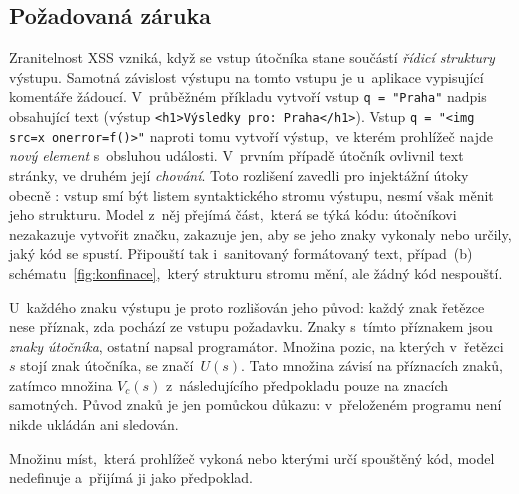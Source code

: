 \subsection{Požadovaná záruka}
\label{sec:model-cil}

Zranitelnost XSS vzniká, když se vstup útočníka stane součástí \emph{řídicí struktury} výstupu. Samotná závislost výstupu na tomto vstupu je u~aplikace vypisující komentáře žádoucí. V~průběžném příkladu vytvoří vstup \texttt{q = "Praha"} nadpis obsahující text (výstup \verb|<h1>Výsledky pro: Praha</h1>|). Vstup \texttt{q = "<img src=x onerror=f()>"} naproti tomu vytvoří výstup,~ve kterém prohlížeč najde \emph{nový element} s~obsluhou události. V~prvním případě útočník ovlivnil text stránky, ve druhém její \emph{chování}. Toto rozlišení zavedli pro injektážní útoky obecně \textcite{su2006essence}: vstup smí být listem syntaktického stromu výstupu, nesmí však měnit jeho strukturu. Model z~něj přejímá část,~která se týká kódu: útočníkovi nezakazuje vytvořit značku, zakazuje jen, aby se jeho znaky vykonaly nebo určily, jaký kód se spustí. Připouští tak i~sanitovaný formátovaný text, případ~(b) schématu~\ref{fig:konfinace},~který strukturu stromu mění, ale žádný kód nespouští.

U~každého znaku výstupu je proto rozlišován jeho původ: každý znak řetězce nese příznak, zda pochází ze vstupu požadavku. Znaky s~tímto příznakem jsou \emph{znaky útočníka}, ostatní napsal programátor. Množina pozic, na kterých v~řetězci~$s$ stojí znak útočníka, se značí~$U(s)$. Tato množina závisí na příznacích znaků, zatímco množina $V_c(s)$ z~následujícího předpokladu pouze na znacích samotných. Původ znaků je jen pomůckou důkazu: v~přeloženém programu není nikde ukládán ani sledován.

Množinu míst,~která prohlížeč vykoná nebo kterými určí spouštěný kód, model nedefinuje a~přijímá ji jako předpoklad.

